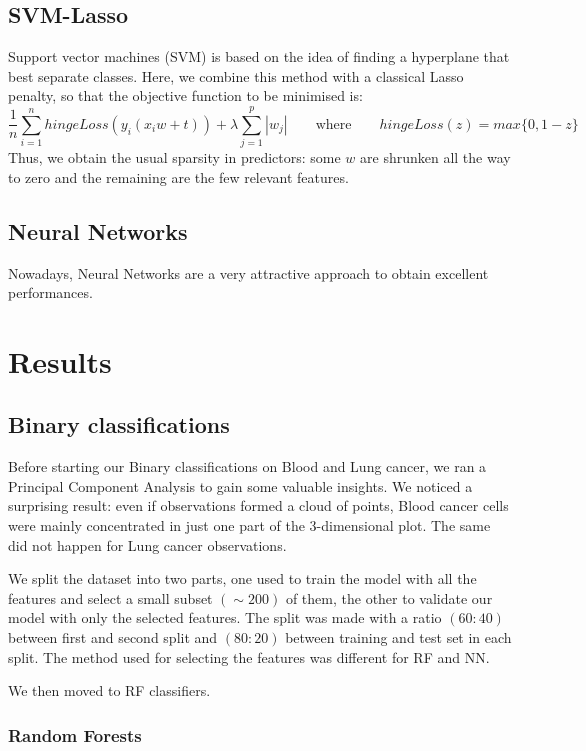 \documentclass[a4paper,11pt, oneside]{article}  %
\begin{document}
	
	\subsection{SVM-Lasso}
	Support vector machines (SVM) is based on the idea of finding a hyperplane that best separate classes. Here, we combine this method with a classical Lasso penalty, so that the objective function to be minimised is:
	\begin{equation*}
		\dfrac{1}{n} \sum_{i=1}^n hingeLoss(y_i(x_i w + t)) + \lambda \sum_{j=1}^p |w_j|  \qquad	\text{where} \qquad  hingeLoss(z) = max\{0, 1-z\}
	\end{equation*}
	Thus, we obtain the usual sparsity in predictors: some $w$ are shrunken all the way to zero and the remaining are the few relevant features.
	
	\subsection{Neural Networks}
	Nowadays, Neural Networks are a very attractive approach to obtain excellent performances.
	
	
	
	\section{Results}
	\subsection{Binary classifications}
	Before starting our Binary classifications on Blood and Lung cancer, we ran a Principal Component Analysis to gain some valuable insights. We noticed a surprising result: even if observations formed a cloud of points, Blood cancer cells were mainly concentrated in just one part of the 3-dimensional plot. The same did not happen for Lung cancer observations.
	
	We split the dataset into two parts, one used to train the model with all the features and select a small subset $(\sim 200)$ of them, the other to validate our model with only the selected features. The split was made with a ratio $(60:40)$ between first and second split and $(80:20)$ between training and test set in each split.
	The method used for selecting the features was different for RF and NN.
	
	We then moved to RF classifiers.  
	
	\subsubsection{Random Forests}
	
\end{document}

